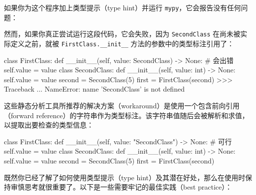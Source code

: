 如果你为这个程序加上类型提示（type hint）并运行 \texttt{mypy}，它会报告没有任何问题：


然而，如果你真正尝试运行这段代码，它会失败，因为 \texttt{SecondClass} 在尚未被实际定义之前，就被 \texttt{FirstClass.\_\_init\_\_} 方法的参数中的类型标注引用了：

\begin{codebox}[python]
class FirstClass:
    def __init__(self, value: SecondClass) -> None:  # 会出错
        self.value = value
class SecondClass:
    def __init__(self, value: int) -> None:
        self.value = value
second = SecondClass(5)
first = FirstClass(second)
>>>
Traceback ...
NameError: name 'SecondClass' is not defined
\end{codebox}

这些静态分析工具所推荐的解决方案（workaround）是使用一个包含前向引用（forward reference）的字符串作为类型标注。该字符串值随后会被解析和求值，以提取出要检查的类型信息：

\begin{codebox}[python]
class FirstClass:
    def __init__(self, value: "SecondClass") -> None:  # 可行
        self.value = value
class SecondClass:
    def __init__(self, value: int) -> None:
        self.value = value
second = SecondClass(5)
first = FirstClass(second)
\end{codebox}

既然你已经了解了如何使用类型提示（type hint）及其潜在好处，那么在使用时保持审慎思考就很重要了。以下是一些需要牢记的最佳实践（best practice）：

